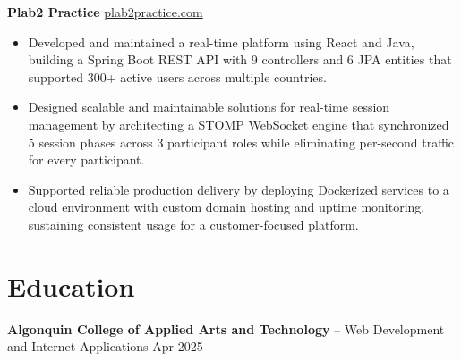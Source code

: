 \documentclass[11pt]{article}       %
\begin{document}
\textbf{Plab2 Practice} \hfill \href{https://plab2practice.com}{plab2practice.com} \\
\vspace{-9pt}
\begin{itemize}
  \item Developed and maintained a real-time platform using React and Java, building a Spring Boot REST API with 9 controllers and 6 JPA entities that supported 300+ active users across multiple countries.
  \item Designed scalable and maintainable solutions for real-time session management by architecting a STOMP WebSocket engine that synchronized 5 session phases across 3 participant roles while eliminating per-second traffic for every participant.
  \item Supported reliable production delivery by deploying Dockerized services to a cloud environment with custom domain hosting and uptime monitoring, sustaining consistent usage for a customer-focused platform.
\end{itemize}





\section*{Education}
\textbf{Algonquin College of Applied Arts and Technology} -- Web Development and Internet Applications
\hfill Apr 2025 \\
\end{document}
